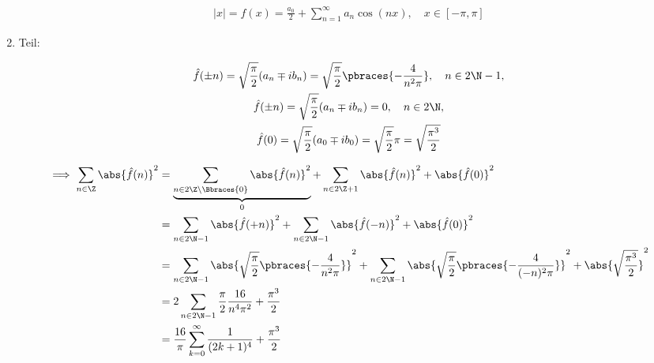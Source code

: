 \begin{solution}
\begin{enumerate}[label = \arabic*.]
    \begin{align*}
        |x|
        =
        f(x)
        =
        \frac{a_0}{2}
        +
        \sum_{n=1}^\infty
        a_n \cos(n x),
        \quad
        x \in [-\pi, \pi]
    \end{align*}

    \item Teil:
    
    \begin{gather*}
        \hat f(\pm n)
        =
        \sqrt \frac{\pi}{2}
        (a_n \mp i b_n)
        =
        \sqrt \frac{\pi}{2}
        \pbraces
        {
            -\frac{4}{n^2 \pi}
        },
        \quad
        n \in 2 \N - 1, \\
        \hat f(\pm n)
        =
        \sqrt \frac{\pi}{2}
        (a_n \mp i b_n)
        =
        0,
        \quad
        n \in 2 \N, \\
        \hat f(0)
        =
        \sqrt \frac{\pi}{2}
        (a_0 \mp i b_0)
        =
        \sqrt \frac{\pi}{2}
        \pi
        =
        \sqrt \frac{\pi^3}{2}
    \end{gather*}

    \begin{align*}
        \implies
        \sum_{n \in \Z}
        \abs{\hat f(n)}^2
        & =
        \underbrace
        {
            \sum_{n \in 2 \Z \setminus \Bbraces{0}}
            \abs{\hat f(n)}^2
        }_0
        +
        \sum_{n \in 2 \Z + 1}
        \abs{\hat f(n)}^2
        +
        \abs{\hat f(0)}^2 \\
        & =
        \sum_{n \in 2 \N - 1}
        \abs{\hat f(+n)}^2
        +
        \sum_{n \in 2 \N - 1}
        \abs{\hat f(-n)}^2
        +
        \abs{\hat f(0)}^2 \\
        & =
        \sum_{n \in 2 \N - 1}
        \abs
        {
            \sqrt \frac{\pi}{2}
            \pbraces
            {
                -\frac{4}{n^2 \pi}
            }            
        }^2
        +
        \sum_{n \in 2 \N - 1}
        \abs
        {
            \sqrt \frac{\pi}{2}
            \pbraces
            {
                -\frac{4}{(-n)^2 \pi}
            }            
        }^2
        +
        \abs
        {
            \sqrt \frac{\pi^3}{2}
        }^2 \\
        & =
        2 \sum_{n \in 2 \N - 1}
        \frac{\pi}{2}
        \frac{16}{n^4 \pi^2}
        +
        \frac{\pi^3}{2} \\
        & =
        \frac{16}{\pi}
        \sum_{k=0}^\infty
        \frac{1}{(2 k + 1)^4}
        +
        \frac{\pi^3}{2}
    \end{align*}


\end{enumerate}
\end{solution}
